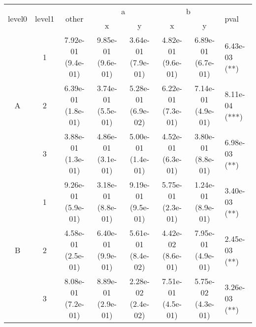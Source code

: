 \begin{tabular}{cccccccl}
\toprule
\multirow{2}{*}{level0} & \multirow{2}{*}{level1}& \multirow{2}{*}{other}&\multicolumn{2}{c}{a}&\multicolumn{2}{c}{b}& \multirow{2}{*}{pval}\tabularnewline
\cmidrule(lr){4-5}
\cmidrule(lr){6-7}
&&&x&y&x&y\tabularnewline
\midrule
\multirow{3}{*}{A}&1& 7.92e-01 (9.4e-01)& 9.85e-01 (9.6e-01)& 3.64e-01 (7.9e-01)& 4.82e-01 (9.6e-01)& 6.89e-01 (6.7e-01)& 6.43e-03 (**)\tabularnewline
&2& 6.39e-01 (1.8e-01)& 3.74e-01 (5.5e-01)& 5.28e-01 (6.9e-02)& 6.22e-01 (7.3e-01)& 7.14e-01 (4.9e-01)& 8.11e-04 (***)\tabularnewline
&3& 3.88e-01 (1.3e-01)& 4.86e-01 (3.1e-01)& 5.00e-01 (1.4e-01)& 4.52e-01 (6.3e-01)& 3.80e-01 (8.8e-01)& 6.98e-03 (**)\tabularnewline
\midrule
\multirow{3}{*}{B}&1& 9.26e-01 (5.9e-01)& 3.18e-01 (8.8e-01)& 9.19e-01 (9.5e-01)& 5.75e-01 (2.3e-01)& 1.24e-01 (8.9e-01)& 3.40e-03 (**)\tabularnewline
&2& 4.58e-01 (2.5e-01)& 6.40e-01 (9.9e-01)& 5.61e-01 (8.4e-02)& 4.42e-02 (8.6e-01)& 7.95e-01 (4.9e-01)& 2.45e-03 (**)\tabularnewline
&3& 8.08e-01 (7.2e-01)& 8.89e-01 (2.9e-01)& 2.28e-02 (2.4e-02)& 7.51e-01 (4.5e-01)& 5.75e-02 (4.3e-01)& 3.26e-03 (**)\tabularnewline
\bottomrule
\end{tabular}

